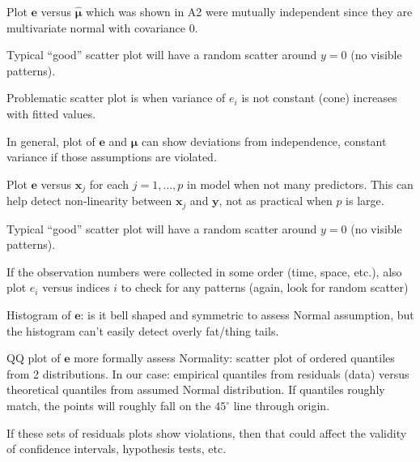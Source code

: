 Plot $ \symbf{e} $ versus $ \hat{\symbf{\mu}} $ which
was shown in A2 were mutually independent
since they are multivariate normal with covariance 0.

Typical ``good'' scatter plot will have a random scatter
around $ y=0 $ (no visible patterns).

Problematic scatter plot is when
variance of $ e_i $ is not constant (cone)
increases with fitted values.

In general, plot of $ \symbf{e} $ and $ \hat{\symbf{\mu}} $
can show deviations from independence, constant variance if those
assumptions are violated.

Plot $ \symbf{e} $ versus $ \symbf{x}_j $ for each $ j=1,\ldots,p $
in model when not many predictors. This can help detect non-linearity
between $ \symbf{x}_j $ and $ \symbf{y} $, not as practical when
$ p $ is large.

Typical ``good'' scatter plot will have a random scatter
around $ y=0 $ (no visible patterns).

If the observation numbers were collected in some order
(time, space, etc.), also plot $ e_i $ versus indices
$ i $ to check for any patterns (again, look for random scatter)

Histogram of $ \symbf{e} $: is it bell shaped and symmetric
to assess Normal assumption, but the histogram can't easily
detect overly fat/thing tails.

QQ plot of $ \symbf{e} $ more formally assess Normality:
scatter plot of ordered quantiles from 2 distributions.
In our case: empirical quantiles from residuals (data)
versus theoretical quantiles from assumed Normal distribution.
If quantiles roughly match, the points will roughly fall
on the $ 45^\circ $ line through origin.

If these sets of residuals plots show violations, then that could
affect the validity of confidence intervals, hypothesis tests, etc.


